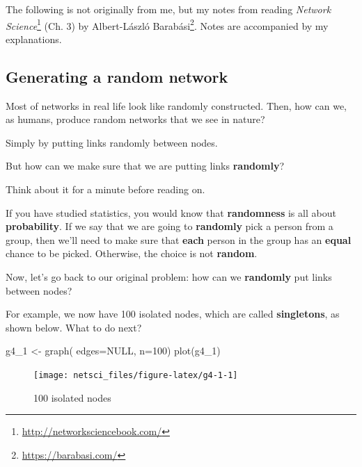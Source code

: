 \documentclass[
]{krantz}
\makeatletter
\newenvironment{Shaded}{\begin{snugshade}}{\end{snugshade}}
\newcommand{\AttributeTok}[1]{\textcolor[rgb]{0.61,0.61,0.61}{#1}}
\newcommand{\ConstantTok}[1]{\textcolor[rgb]{0,0,0}{#1}}
\newcommand{\DecValTok}[1]{\textcolor[rgb]{0.06,0.06,0.06}{#1}}
\newcommand{\FunctionTok}[1]{\textcolor[rgb]{0,0,0}{#1}}
\newcommand{\NormalTok}[1]{#1}
\newcommand{\OtherTok}[1]{\textcolor[rgb]{0.37,0.37,0.37}{#1}}
\renewcommand{\href}[2]{#2\footnote{\url{#1}}}
\newenvironment{kframe}{%
\medskip{}
\setlength{\fboxsep}{.8em}
 \def\at@end@of@kframe{}%
 \ifinner\ifhmode%
  \def\at@end@of@kframe{\end{minipage}}%
  \begin{minipage}{\columnwidth}%
 \fi\fi%
 \def\FrameCommand##1{\hskip\@totalleftmargin \hskip-\fboxsep
 \colorbox{shadecolor}{##1}\hskip-\fboxsep
     \hskip-\linewidth \hskip-\@totalleftmargin \hskip\columnwidth}%
 \MakeFramed {\advance\hsize-\width
   \@totalleftmargin\z@ \linewidth\hsize
   \@setminipage}}%
 {\par\unskip\endMakeFramed%
 \at@end@of@kframe}
\renewenvironment{Shaded}{\begin{kframe}}{\end{kframe}}
\newenvironment{rmdblock}[1]
  {
  \begin{itemize}
  \renewcommand{\labelitemi}{
    \raisebox{-.7\height}[0pt][0pt]{
      {\setkeys{Gin}{width=3em,keepaspectratio}\texttt{[image: images/\#1]}}
    }
  }
  \setlength{\fboxsep}{1em}
  \begin{kframe}
  \item
  }
  {
  \end{kframe}
  \end{itemize}
  }
\newenvironment{rmdnote}
  {\begin{rmdblock}{note}}
  {\end{rmdblock}}
\makeatother
\begin{document}
\begin{rmdnote}
The following is not originally from me, but my notes from reading \href{http://networksciencebook.com/}{\emph{Network Science}} (Ch. 3) by \href{https://barabasi.com/}{Albert-László Barabási}. Notes are accompanied by my explanations.
\end{rmdnote}

\hypertarget{generating-a-random-network}{%
\subsection{Generating a random network}\label{generating-a-random-network}}

Most of networks in real life look like randomly constructed. Then, how can we, as humans, produce random networks that we see in nature?

Simply by putting links randomly between nodes.

But how can we make sure that we are putting links \textbf{randomly}?

Think about it for a minute before reading on.

If you have studied statistics, you would know that \textbf{randomness} is all about \textbf{probability}. If we say that we are going to \textbf{randomly} pick a person from a group, then we'll need to make sure that \textbf{each} person in the group has an \textbf{equal} chance to be picked. Otherwise, the choice is not \textbf{random}.

Now, let's go back to our original problem: how can we \textbf{randomly} put links between nodes?

For example, we now have 100 isolated nodes, which are called \textbf{singletons}, as shown below. What to do next?

\begin{Shaded}
\begin{Highlighting}[]
\NormalTok{g4\_1 }\OtherTok{\textless{}{-}} \FunctionTok{graph}\NormalTok{( }\AttributeTok{edges=}\ConstantTok{NULL}\NormalTok{, }\AttributeTok{n=}\DecValTok{100}\NormalTok{)}
\FunctionTok{plot}\NormalTok{(g4\_1)}
\end{Highlighting}
\end{Shaded}

\begin{figure}

{\centering \texttt{[image: netsci\_files/figure-latex/g4-1-1]} 

}

\caption{100 isolated nodes}\label{fig:g4-1}
\end{figure}
\end{document}
